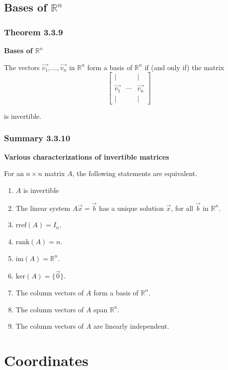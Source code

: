 \documentclass{report}
\begin{document}
\subsection*{Bases of $\mathbb{R}^{n}$}
\subsubsection*{Theorem 3.3.9}
\par\noindent\textbf{Bases of $\mathbb{R}^{n}$}
\par\noindent The vectors $\vec{v_{1}},\ldots{},\vec{v_{n}}$ in $\mathbb{R}^{n}$ form a basis of $\mathbb{R}^{n}$ if (and only if) the matrix
\[\left[\begin{array}{ccc}|& &|\\ \vec{v_{1}}&\cdots{}&\vec{v_{n}}\\ |& &|\end{array}\right]\]
\par\noindent is invertible.
\subsubsection*{Summary 3.3.10}
\par\noindent\textbf{Various characterizations of invertible matrices}
\par\noindent For an $n\times{}n$ matrix $A$, the following statements are equivalent.
\renewcommand{\labelenumi}{\textbf{\roman{enumi}.}}
\begin{enumerate}
\item $A$ is invertible
\item The linear system $A\vec{x}=\vec{b}$ has a unique solution $\vec{x}$, for all $\vec{b}$ in $\mathbb{R}^{n}$.
\item $\textrm{rref}(A)=I_{n}$.
\item $\textrm{rank}(A)=n$.
\item $\textrm{im}(A)=\mathbb{R}^{n}$.
\item $\textrm{ker}(A)=\{\vec{0}\}$.
\item The column vectors of $A$ form a basis of $\mathbb{R}^{n}$.
\item The column vectors of $A$ span $\mathbb{R}^{n}$.
\item The column vectors of $A$ are linearly independent.
\end{enumerate}
\pagebreak

\section{Coordinates}
\end{document}
